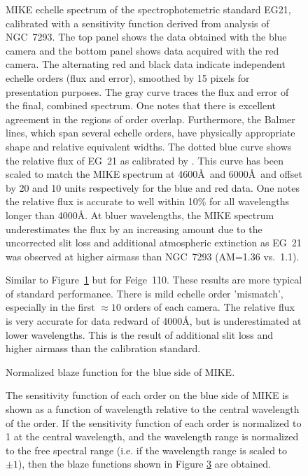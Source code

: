 \documentclass[12pt,preprint]{aastex}
\begin{document}
\begin{figure}
\caption{MIKE echelle spectrum of the spectrophotemetric
standard EG21, calibrated with a sensitivity function derived
from analysis of NGC~7293.  The top panel shows the data
obtained with the blue camera and the bottom panel shows data
acquired with the red camera.  
The alternating red and black data
indicate independent echelle orders (flux and error), 
smoothed by 15 pixels for presentation purposes.  The gray curve 
traces the flux and error of the final, combined spectrum.
One notes that there is excellent agreement in the regions of
order overlap.  Furthermore, the Balmer lines, which span 
several echelle orders, have physically appropriate shape
and relative equivalent widths.
The dotted blue curve shows the relative flux of EG~21 as
calibrated by \cite{hamuy94}.  This curve
has been scaled to match the MIKE spectrum at 4600\AA\
and 6000\AA\ and offset by 20 and 10 units respectively for the
blue and red data.  One notes the relative flux is accurate to
well within 10$\%$ for all wavelengths longer than 4000\AA.
At bluer wavelengths, the MIKE spectrum underestimates the flux
by an increasing amount due to the uncorrected slit loss and 
additional atmospheric extinction as EG~21 was observed at
higher airmass than NGC~7293 (AM=1.36 vs.\ 1.1).
}
\label{fig:eg21}
\end{figure}

\begin{figure}
\caption{Similar to Figure~\ref{fig:eg21} but for Feige~110.
These results are more typical of standard performance.  There is mild
echelle order 'mismatch', especially in the first $\approx 10$
orders of each camera.  The relative flux is very accurate for
data redward of 4000\AA, but is underestimated at
lower wavelengths.  This is the result of additional slit loss
and higher airmass than the calibration standard.
}
\label{fig:feige110}
\end{figure}

\begin{figure}
\caption{Normalized blaze function for the blue side of MIKE.
}
\label{fig:blaze}
\end{figure}

\begin{figure}
\caption{The sensitivity function of each order on the blue side of
    MIKE is shown as a function of wavelength relative to the central
    wavelength of the order.  If the sensitivity function of each
    order is normalized to 1 at the central wavelength, and the
    wavelength range is normalized to the free spectral range (i.e. if
    the wavelength range is scaled to ${\pm 1}$), then the blaze
    functions shown in Figure \ref{fig:blaze} are obtained.
    }
\label{fig:sensitivity}
\end{figure}
\end{document}
